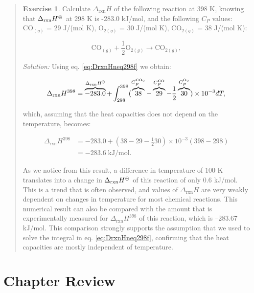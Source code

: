 \documentclass[
  9pt,
]{extbook}
\theoremstyle{definition}
\theoremstyle{definition}
\theoremstyle{definition}
\newtheorem{exercise}{Exercise}[chapter]
\theoremstyle{definition}
\theoremstyle{remark}
\begin{document}
\begin{quote}
\begin{exercise}
\protect\hypertarget{exr:DHtdiff298}{}\label{exr:DHtdiff298}Calculate \(\Delta_{\text{rxn}}H\) of the following reaction at 398 K, knowing that \(\Delta_{\text{rxn}}H^{-\kern-6pt{\ominus}\kern-6pt-}\) at 298 K is -283.0 kJ/mol, and the following \(C_P\) values: \(\mathrm{CO}_{(g)}\) = 29 J/(mol K), \(\mathrm{O}_{2(g)}\) = 30 J/(mol K), \(\mathrm{CO}_{2(g)}\) = 38 J/(mol K):

\[\mathrm{CO}_{(g)}+\frac{1}{2}\mathrm{O}_{2(g)} \rightarrow \mathrm{CO}_{2(g)},\]

\emph{Solution:} Using eq. \eqref{eq:DrxnHneq298f} we obtain:

\[\Delta_{\text{rxn}} H^{398} = \overbrace{-283.0}^{\Delta_{\text{rxn}}H^{-\kern-6pt{\ominus}\kern-6pt-}} + \int_{298}^{398} ( \overbrace{38}^{C_P^{\mathrm{CO}_2}} -\overbrace{29}^{C_P^{\mathrm{CO}}} -\frac{1}{2}\overbrace{30}^{C_P^{\mathrm{O}_2}} ) \times 10^{-3} dT,\]

which, assuming that the heat capacities does not depend on the temperature, becomes:

\begin{equation}
\begin{aligned}
 \Delta_{\text{rxn}} H^{398} &= -283.0 + \left(38-29-\frac{1}{2}30 \right) \times 10^{-3} (398-298) \\ &= -283.6 \; \text{kJ/mol}.
\end{aligned}
\end{equation}

As we notice from this result, a difference in temperature of 100 K translates into a change in \(\Delta_{\text{rxn}}H^{-\kern-6pt{\ominus}\kern-6pt-}\) of this reaction of only 0.6 kJ/mol. This is a trend that is often observed, and values of \(\Delta_{\text{rxn}}H\) are very weakly dependent on changes in temperature for most chemical reactions. This numerical result can also be compared with the amount that is experimentally measured for \(\Delta_{\text{rxn}}H^{398}\) of this reaction, which is --283.67 kJ/mol. This comparison strongly supports the assumption that we used to solve the integral in eq. \eqref{eq:DrxnHneq298f}, confirming that the heat capacities are mostly independent of temperature.
\end{exercise}
\end{quote}

\section{Chapter Review}\label{rev4}
\end{document}
